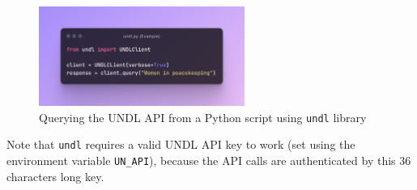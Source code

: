 \begin{figure}[!ht]
    \centering
    \includegraphics[width=0.6\textwidth]{res/import-undl.png}
    \caption{Querying the UNDL API from a Python script using \texttt{undl} library}
    \label{fig:undl-py}
\end{figure}

Note that \texttt{undl} requires a valid UNDL API key to work (set using the environment variable \texttt{UN\_API}), because the API calls are authenticated by this $36$ characters long key.

